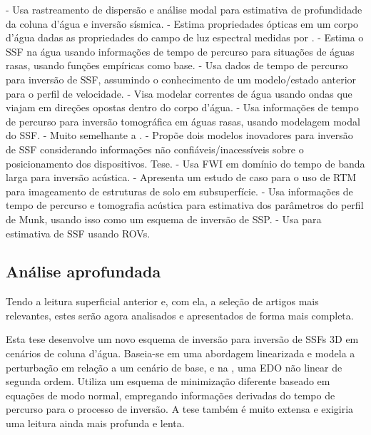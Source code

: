 \begin{itemize}
	 - Usa rastreamento de dispersão e análise modal para estimativa de profundidade da coluna d'água e inversão sísmica.
	 - Estima propriedades ópticas em um corpo d'água dadas as propriedades do campo de luz espectral medidas por .
	 - Estima o SSF na água usando informações de tempo de percurso para situações de águas rasas, usando funções empíricas como base.
	 - Usa dados de tempo de percurso para inversão de SSF, assumindo o conhecimento de um modelo/estado anterior para o perfil de velocidade.
	 - Visa modelar correntes de água usando ondas que viajam em direções opostas dentro do corpo d'água.
	 - Usa informações de tempo de percurso para inversão tomográfica em águas rasas, usando modelagem modal do SSF.
	 - Muito semelhante a \cite{ritter_water_2010}.
	 - Propõe dois modelos inovadores para inversão de SSF considerando informações não confiáveis/inacessíveis sobre o posicionamento dos dispositivos. Tese.
	 - Usa FWI em domínio do tempo de banda larga para inversão acústica.
	 - Apresenta um estudo de caso para o uso de RTM para imageamento de estruturas de solo em subsuperfície.
	 - Usa informações de tempo de percurso e tomografia acústica para estimativa dos parâmetros do perfil de Munk, usando isso como um esquema de inversão de SSP.
	 - Usa  para estimativa de SSF usando ROVs.
\end{itemize}

\subsection{Análise aprofundada}
\label{sec_rssfi:subsec_deeper-analysis}

Tendo a leitura superficial anterior e, com ela, a seleção de artigos mais relevantes, estes serão agora analisados e apresentados de forma mais completa.


Esta tese \cite{bender_threedimensional_2012} desenvolve um novo esquema de inversão para inversão de SSFs 3D em cenários de coluna d'água. Baseia-se em uma abordagem linearizada e modela a perturbação em relação a um cenário de base, e na , uma EDO não linear de segunda ordem. Utiliza um esquema de minimização diferente baseado em equações de modo normal, empregando informações derivadas do tempo de percurso para o processo de inversão. A tese também é muito extensa e exigiria uma leitura ainda mais profunda e lenta.

